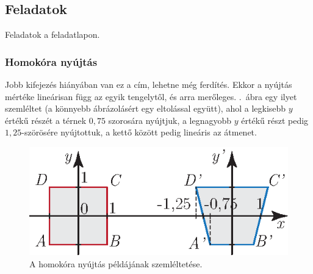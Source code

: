\documentclass[12pt,a4paper]{scrartcl}
\begin{document}
\subsection{Feladatok}
Feladatok a feladatlapon.


\subsubsection{Homokóra nyújtás}
Jobb kifejezés hiányában van ez a cím, lehetne még ferdítés. Ekkor a nyújtás mértéke lineárisan függ az egyik tengelytől, és arra merőleges. .\ ábra egy ilyet szemléltet (a könnyebb ábrázolásért egy eltolással együtt), ahol a legkisebb $y$ értékű részét a térnek $0{,}75$ szorosára nyújtjuk, a legnagyobb $y$ értékű részt pedig $1{,}25$-szörösére nyújtottuk, a kettő között pedig lineáris az átmenet.
\begin{figure}[htb] 
\centering    
\includegraphics[scale=1]{figs/homokora_nyujtas_szamolos.eps}
\caption{A homokóra nyújtás példájának szemléltetése.}
\label{fig:homokora_nyujtas_szamolos}
\end{figure}
\end{document}
